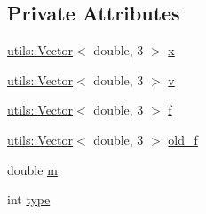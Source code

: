 \subsection*{Private Attributes}
\begin{DoxyCompactItemize}
\item 
\hyperlink{classutils_1_1Vector}{utils\-::\-Vector}$<$ double, 3 $>$ \hyperlink{classParticle_a3789900d6fe19a75d3a82cd5e9622c4c}{x}
\item 
\hyperlink{classutils_1_1Vector}{utils\-::\-Vector}$<$ double, 3 $>$ \hyperlink{classParticle_ac3669e50d83d8608d522965b9acd1d8b}{v}
\item 
\hyperlink{classutils_1_1Vector}{utils\-::\-Vector}$<$ double, 3 $>$ \hyperlink{classParticle_ad9aa3e171ea950b2cff1b4825e67845b}{f}
\item 
\hyperlink{classutils_1_1Vector}{utils\-::\-Vector}$<$ double, 3 $>$ \hyperlink{classParticle_ad9281e33474f23f7261f28848affc4a4}{old\-\_\-f}
\item 
double \hyperlink{classParticle_aedcc7e1bc53b0e2b1a4a07c9a1b47563}{m}
\item 
int \hyperlink{classParticle_a2b73dd42bcd56ba2e7ffeb0a5515a866}{type}
\end{DoxyCompactItemize}


